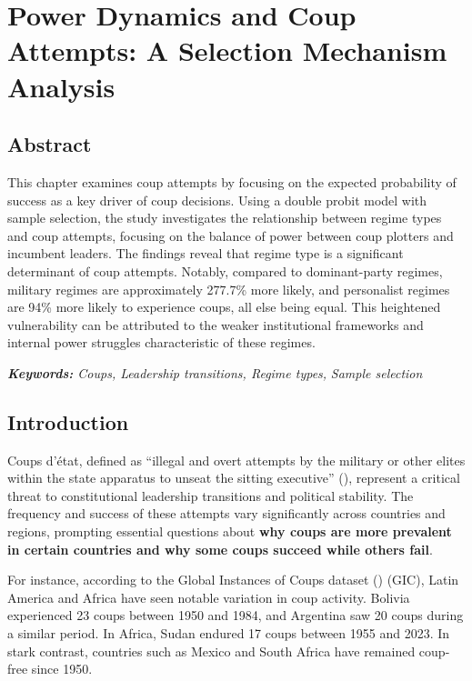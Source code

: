 \documentclass[
  12pt,
]{report}
\begin{document}
\chapter{Power Dynamics and Coup Attempts: A Selection Mechanism
Analysis}\label{sec-chapter2}

\section*{Abstract}\label{abstract-1}

This chapter examines coup attempts by focusing on the expected
probability of success as a key driver of coup decisions. Using a double
probit model with sample selection, the study investigates the
relationship between regime types and coup attempts, focusing on the
balance of power between coup plotters and incumbent leaders. The
findings reveal that regime type is a significant determinant of coup
attempts. Notably, compared to dominant-party regimes, military regimes
are approximately 277.7\% more likely, and personalist regimes are 94\%
more likely to experience coups, all else being equal. This heightened
vulnerability can be attributed to the weaker institutional frameworks
and internal power struggles characteristic of these regimes.

\emph{\textbf{Keywords:} Coups, Leadership transitions, Regime types,}
\emph{Sample selection}

\newpage

\section{Introduction}\label{introduction-1}

Coups d'état, defined as ``illegal and overt attempts by the military or
other elites within the state apparatus to unseat the sitting
executive'' (),
represent a critical threat to constitutional leadership transitions and
political stability. The frequency and success of these attempts vary
significantly across countries and regions, prompting essential
questions about \textbf{why coups are more prevalent in certain
countries and why some coups succeed while others fail}.

For instance, according to the Global Instances of Coups dataset
() (GIC), Latin America
and Africa have seen notable variation in coup activity. Bolivia
experienced 23 coups between 1950 and 1984, and Argentina saw 20 coups
during a similar period. In Africa, Sudan endured 17 coups between 1955
and 2023. In stark contrast, countries such as Mexico and South Africa
have remained coup-free since 1950.
\end{document}
